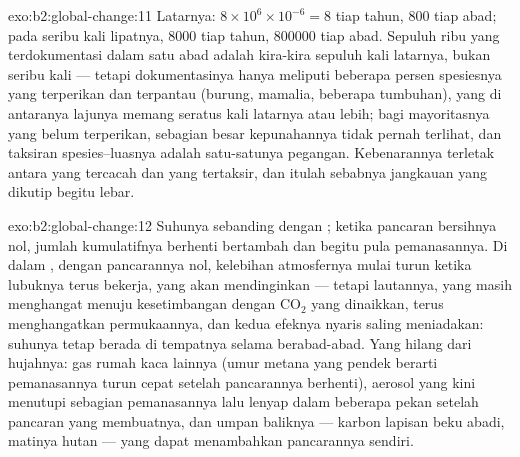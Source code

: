 \begin{solution}{exo:b2:global-change:11}
Latarnya: $8\times 10^{6}\times 10^{-6} = 8$ tiap tahun, 800 tiap abad;
pada seribu kali lipatnya, 8000 tiap tahun, \num{800000} tiap abad.
Sepuluh ribu yang terdokumentasi dalam satu abad adalah kira-kira
sepuluh kali latarnya, bukan seribu kali --- tetapi dokumentasinya
hanya meliputi beberapa persen spesiesnya yang terperikan dan terpantau
(burung, mamalia, beberapa tumbuhan), yang di antaranya lajunya memang
seratus kali latarnya atau lebih; bagi mayoritasnya yang belum
terperikan, sebagian besar kepunahannya tidak pernah terlihat, dan
taksiran spesies--luasnya adalah satu-satunya pegangan. Kebenarannya
terletak antara yang tercacah dan yang tertaksir, dan itulah sebabnya
jangkauan yang dikutip begitu lebar.
\end{solution}

\begin{solution}{exo:b2:global-change:12}
Suhunya sebanding dengan ; ketika pancaran
bersihnya nol, jumlah kumulatifnya berhenti bertambah dan begitu pula
pemanasannya. Di dalam , dengan pancarannya nol,
kelebihan atmosfernya mulai turun ketika lubuknya terus bekerja, yang
akan mendinginkan --- tetapi lautannya, yang masih menghangat menuju
kesetimbangan dengan \ensuremath{\mathrm{CO_2}} yang dinaikkan, terus
menghangatkan permukaannya, dan kedua efeknya nyaris saling meniadakan:
suhunya tetap berada di tempatnya selama berabad-abad. Yang hilang dari
hujahnya: gas rumah kaca lainnya (umur metana yang pendek berarti
pemanasannya turun cepat setelah pancarannya berhenti), aerosol yang
kini menutupi sebagian pemanasannya lalu lenyap dalam beberapa pekan
setelah pancaran yang membuatnya, dan umpan baliknya --- karbon lapisan
beku abadi, matinya hutan --- yang dapat menambahkan pancarannya
sendiri.
\end{solution}

